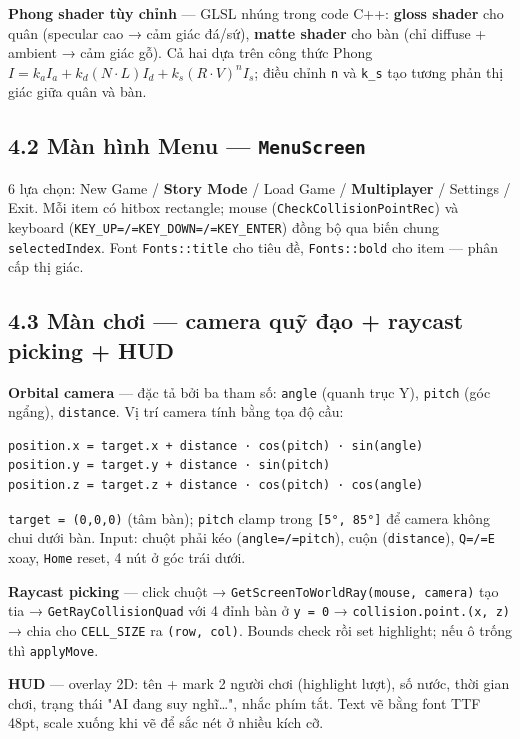 \documentclass[11pt,a4paper]{article}
\begin{document}
\textbf{Phong shader tùy chỉnh} — GLSL nhúng trong code C++: \textbf{gloss shader} cho quân (specular cao → cảm giác đá/sứ), \textbf{matte shader} cho bàn (chỉ diffuse + ambient → cảm giác gỗ). Cả hai dựa trên công thức Phong \(I = k_a I_a + k_d (N \cdot L) I_d + k_s (R \cdot V)^n I_s\); điều chỉnh \texttt{n} và \texttt{k\_s} tạo tương phản thị giác giữa quân và bàn.
\subsection{4.2 Màn hình Menu — \texttt{MenuScreen}}
\label{sec:org7f4025e}

6 lựa chọn: New Game / \textbf{Story Mode} / Load Game / \textbf{Multiplayer} / Settings / Exit. Mỗi item có hitbox rectangle; mouse (\texttt{CheckCollisionPointRec}) và keyboard (\texttt{KEY\_UP=/=KEY\_DOWN=/=KEY\_ENTER}) đồng bộ qua biến chung \texttt{selectedIndex}. Font \texttt{Fonts::title} cho tiêu đề, \texttt{Fonts::bold} cho item — phân cấp thị giác.
\subsection{4.3 Màn chơi — camera quỹ đạo + raycast picking + HUD}
\label{sec:orgbe96feb}

\textbf{Orbital camera} — đặc tả bởi ba tham số: \texttt{angle} (quanh trục Y), \texttt{pitch} (góc ngẩng), \texttt{distance}. Vị trí camera tính bằng tọa độ cầu:

\begin{verbatim}
position.x = target.x + distance · cos(pitch) · sin(angle)
position.y = target.y + distance · sin(pitch)
position.z = target.z + distance · cos(pitch) · cos(angle)
\end{verbatim}

\texttt{target = (0,0,0)} (tâm bàn); \texttt{pitch} clamp trong \texttt{[5°, 85°]} để camera không chui dưới bàn. Input: chuột phải kéo (\texttt{angle=/=pitch}), cuộn (\texttt{distance}), \texttt{Q=/=E} xoay, \texttt{Home} reset, 4 nút ở góc trái dưới.

\textbf{Raycast picking} — click chuột → \texttt{GetScreenToWorldRay(mouse, camera)} tạo tia → \texttt{GetRayCollisionQuad} với 4 đỉnh bàn ở \texttt{y = 0} → \texttt{collision.point.(x, z)} → chia cho \texttt{CELL\_SIZE} ra \texttt{(row, col)}. Bounds check rồi set highlight; nếu ô trống thì \texttt{applyMove}.

\textbf{HUD} — overlay 2D: tên + mark 2 người chơi (highlight lượt), số nước, thời gian chơi, trạng thái "AI đang suy nghĩ…", nhắc phím tắt. Text vẽ bằng font TTF 48pt, scale xuống khi vẽ để sắc nét ở nhiều kích cỡ.
\end{document}
